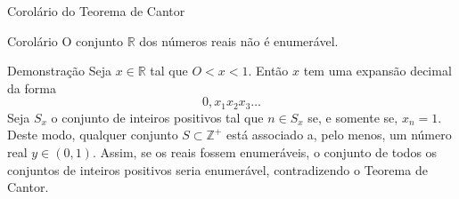 \begin{frame}[fragile]{Corolário do Teorema de Cantor}

    \begin{block}{Corolário}
        O conjunto $\mathbb{R}$ dos números reais não é enumerável.
    \end{block}

    \begin{block}{Demonstração}
        Seja $x\in\mathbb{R}$ tal que $O < x < 1$. Então $x$ tem uma expansão decimal da forma
        \[
            0,x_1x_2x_3\ldots
        \]
        Seja $S_x$ o conjunto de inteiros positivos tal que $n\in S_x$ se, e somente se, 
            $x_n = 1$. Deste modo, qualquer conjunto $S\subset \mathbb{Z}^+$ está associado a,
            pelo menos, um número real $y\in (0, 1)$. Assim, se os reais fossem enumeráveis,
            o conjunto de todos os conjuntos de inteiros positivos seria enumerável, contradizendo
            o Teorema de Cantor.
            
    \end{block}
\end{frame}
